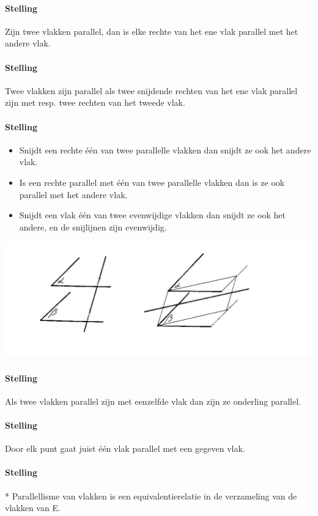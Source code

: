 \documentclass[12pt,twoside]{article}
\begin{document}
\paragraph*{Stelling}
Zijn twee vlakken parallel, dan is elke rechte van het ene vlak parallel met het andere vlak.

\paragraph*{Stelling}
Twee vlakken zijn parallel als twee snijdende rechten van het ene vlak parallel zijn met resp. twee rechten van het tweede vlak.

\paragraph*{Stelling}
\begin{itemize}
  \item Snijdt een rechte één van twee parallelle vlakken dan snijdt ze ook het andere vlak.
  \item Is een rechte parallel met één van twee parallelle vlakken dan is ze ook parallel met het andere vlak.
  \item Snijdt een vlak één van twee evenwijdige vlakken dan snijdt ze ook het andere, en de snijlijnen zijn evenwijdig.
\end{itemize}
\begin{center}
  \includegraphics[width=.7\textwidth]{stelling_11}
\end{center}

\paragraph*{Stelling}
Als twee vlakken parallel zijn met eenzelfde vlak dan zijn ze onderling parallel.

\paragraph*{Stelling}
Door elk punt gaat juist één vlak parallel met een gegeven vlak.

\paragraph*{Stelling}*
Parallellisme van vlakken is een equivalentierelatie in de verzameling van de vlakken van E.
\end{document}
